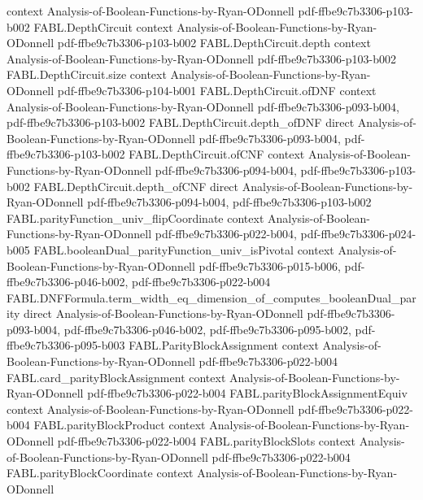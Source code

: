 \begin{theorem}
  {context}
  {Analysis-of-Boolean-Functions-by-Ryan-ODonnell}
  {pdf-ffbe9c7b3306-p103-b002}
\proofstep
  {FABL.DepthCircuit}
  {context}
  {Analysis-of-Boolean-Functions-by-Ryan-ODonnell}
  {pdf-ffbe9c7b3306-p103-b002}
\proofstep
  {FABL.DepthCircuit.depth}
  {context}
  {Analysis-of-Boolean-Functions-by-Ryan-ODonnell}
  {pdf-ffbe9c7b3306-p103-b002}
\proofstep
  {FABL.DepthCircuit.size}
  {context}
  {Analysis-of-Boolean-Functions-by-Ryan-ODonnell}
  {pdf-ffbe9c7b3306-p104-b001}
\proofstep
  {FABL.DepthCircuit.ofDNF}
  {context}
  {Analysis-of-Boolean-Functions-by-Ryan-ODonnell}
  {pdf-ffbe9c7b3306-p093-b004,
    pdf-ffbe9c7b3306-p103-b002}
\proofstep
  {FABL.DepthCircuit.depth_ofDNF}
  {direct}
  {Analysis-of-Boolean-Functions-by-Ryan-ODonnell}
  {pdf-ffbe9c7b3306-p093-b004,
    pdf-ffbe9c7b3306-p103-b002}
\proofstep
  {FABL.DepthCircuit.ofCNF}
  {context}
  {Analysis-of-Boolean-Functions-by-Ryan-ODonnell}
  {pdf-ffbe9c7b3306-p094-b004,
    pdf-ffbe9c7b3306-p103-b002}
\proofstep
  {FABL.DepthCircuit.depth_ofCNF}
  {direct}
  {Analysis-of-Boolean-Functions-by-Ryan-ODonnell}
  {pdf-ffbe9c7b3306-p094-b004,
    pdf-ffbe9c7b3306-p103-b002}
\proofstep
  {FABL.parityFunction_univ_flipCoordinate}
  {context}
  {Analysis-of-Boolean-Functions-by-Ryan-ODonnell}
  {pdf-ffbe9c7b3306-p022-b004,
    pdf-ffbe9c7b3306-p024-b005}
\proofstep
  {FABL.booleanDual_parityFunction_univ_isPivotal}
  {context}
  {Analysis-of-Boolean-Functions-by-Ryan-ODonnell}
  {pdf-ffbe9c7b3306-p015-b006,
    pdf-ffbe9c7b3306-p046-b002,
    pdf-ffbe9c7b3306-p022-b004}
\proofstep
  {FABL.DNFFormula.term_width_eq_dimension_of_computes_booleanDual_parity}
  {direct}
  {Analysis-of-Boolean-Functions-by-Ryan-ODonnell}
  {pdf-ffbe9c7b3306-p093-b004,
    pdf-ffbe9c7b3306-p046-b002,
    pdf-ffbe9c7b3306-p095-b002,
    pdf-ffbe9c7b3306-p095-b003}
\proofstep
  {FABL.ParityBlockAssignment}
  {context}
  {Analysis-of-Boolean-Functions-by-Ryan-ODonnell}
  {pdf-ffbe9c7b3306-p022-b004}
\proofstep
  {FABL.card_parityBlockAssignment}
  {context}
  {Analysis-of-Boolean-Functions-by-Ryan-ODonnell}
  {pdf-ffbe9c7b3306-p022-b004}
\proofstep
  {FABL.parityBlockAssignmentEquiv}
  {context}
  {Analysis-of-Boolean-Functions-by-Ryan-ODonnell}
  {pdf-ffbe9c7b3306-p022-b004}
\proofstep
  {FABL.parityBlockProduct}
  {context}
  {Analysis-of-Boolean-Functions-by-Ryan-ODonnell}
  {pdf-ffbe9c7b3306-p022-b004}
\proofstep
  {FABL.parityBlockSlots}
  {context}
  {Analysis-of-Boolean-Functions-by-Ryan-ODonnell}
  {pdf-ffbe9c7b3306-p022-b004}
\proofstep
  {FABL.parityBlockCoordinate}
  {context}
  {Analysis-of-Boolean-Functions-by-Ryan-ODonnell}

\end{theorem}
